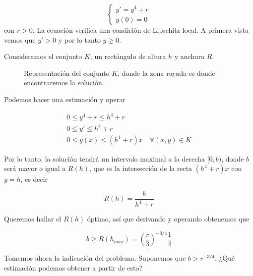 \documentclass[nochap]{apuntes}
\begin{document}
\begin{example}
\[ \begin{cases}
y' = y^4 + r \\
y(0) = 0
\end{cases}
\] 
con $r>0$. La ecuación verifica una condición de Lipschitz local. A primera vista vemos que $y'>0$ y por lo tanto $y≥0$.

Consideramos el conjunto $K$, un rectángulo de altura $h$ y anchura $R$.

\begin{figure}[hbtp]
\centering
{}
\caption{Representación del conjunto $K$, donde la zona rayada es donde encontraremos la solución.}
\end{figure}

Podemos hacer una estimación y operar

\begin{gather*}
0 ≤ y^4 + r ≤ h^4 + r \\
0 ≤ y' ≤ h^4 + r \\
0 ≤ y(x) ≤ (h^4+r)x \quad ∀(x,y) ∈ K
\end{gather*}

Por lo tanto, la solución tendrá un intervalo maximal a la derecha $[0,b)$, donde $b$ será mayor o igual a $R(h)$, que es la intersección de la recta $(h^4+r)x$ con $y=h$, es decir

\[ R(h) = \frac{h}{h^4+r} \]

Queremos hallar el $R(h)$ óptimo, así que derivando y operando obtenemos que

\[ b ≥ R(h_{max}) = \left(\frac{r}{3}\right)^{-3/4} \frac{1}{4} \]

Tomemos ahora la indicación del problema. Suponemos que $b>r^{-3/4}$. ¿Qué estimación podemos obtener a partir de esto? 

\end{example}
\end{document}
